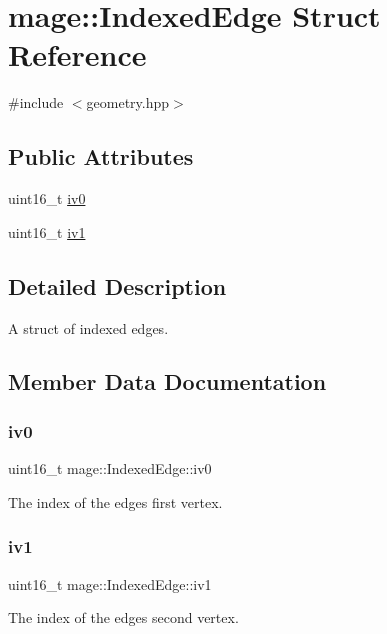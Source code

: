 \hypertarget{structmage_1_1_indexed_edge}{}\section{mage\+:\+:Indexed\+Edge Struct Reference}
\label{structmage_1_1_indexed_edge}


{\ttfamily \#include $<$geometry.\+hpp$>$}

\subsection*{Public Attributes}
\begin{DoxyCompactItemize}
\item 
uint16\+\_\+t \hyperlink{structmage_1_1_indexed_edge_a3aff35f469e9e96f7cf43a0cf7621a8f}{iv0}
\item 
uint16\+\_\+t \hyperlink{structmage_1_1_indexed_edge_ab78691aa78fe2fee801951d87fdfc0b0}{iv1}
\end{DoxyCompactItemize}


\subsection{Detailed Description}
A struct of indexed edges. 

\subsection{Member Data Documentation}
\hypertarget{structmage_1_1_indexed_edge_a3aff35f469e9e96f7cf43a0cf7621a8f}{}\label{structmage_1_1_indexed_edge_a3aff35f469e9e96f7cf43a0cf7621a8f} 
\subsubsection{\texorpdfstring{iv0}{iv0}}
{\footnotesize\ttfamily uint16\+\_\+t mage\+::\+Indexed\+Edge\+::iv0}

The index of the edge\textquotesingle{}s first vertex. \hypertarget{structmage_1_1_indexed_edge_ab78691aa78fe2fee801951d87fdfc0b0}{}\label{structmage_1_1_indexed_edge_ab78691aa78fe2fee801951d87fdfc0b0} 
\subsubsection{\texorpdfstring{iv1}{iv1}}
{\footnotesize\ttfamily uint16\+\_\+t mage\+::\+Indexed\+Edge\+::iv1}

The index of the edge\textquotesingle{}s second vertex. 
